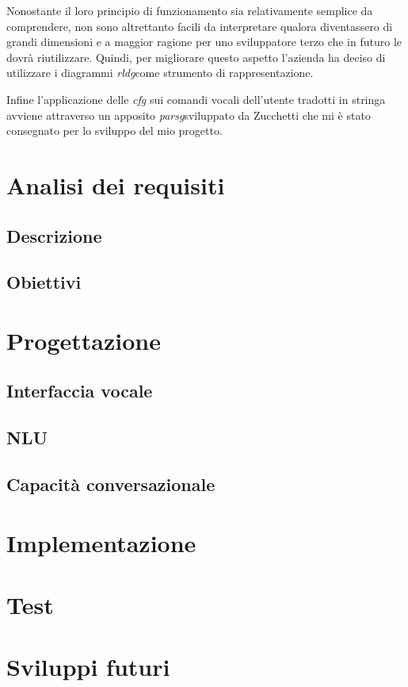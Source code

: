 
Nonostante il loro principio di funzionamento sia relativamente semplice da comprendere, non sono altrettanto facili da interpretare qualora diventassero di grandi dimensioni e a maggior ragione per uno sviluppatore terzo che in futuro le dovrà riutilizzare. Quindi, per migliorare questo aspetto l'azienda ha deciso di utilizzare i diagrammi \emph{\gls{rldg}}\glsfirstoccur come strumento di rappresentazione.


Infine l'applicazione delle \emph{\gls{cfg}} sui comandi vocali dell'utente tradotti in stringa avviene attraverso un apposito \emph{\gls{parsg}}\glsfirstoccur sviluppato da Zucchetti che mi è stato consegnato per lo sviluppo del mio progetto.
\section{Analisi dei requisiti}
	\subsection{Descrizione}
	\subsection{Obiettivi}

\section{Progettazione}
	\subsection{Interfaccia vocale}
	\subsection{NLU}
	\subsection{Capacità conversazionale}

\section{Implementazione}

\section{Test}

\section{Sviluppi futuri}
